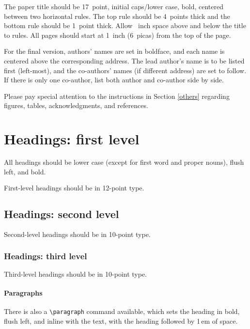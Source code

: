 \documentclass{article}
\begin{document}
The paper title should be 17~point, initial caps/lower case, bold, centered
between two horizontal rules. The top rule should be 4~points thick and the
bottom rule should be 1~point thick. Allow ~inch space above and
below the title to rules. All pages should start at 1~inch (6~picas) from the
top of the page.

For the final version, authors' names are set in boldface, and each name is
centered above the corresponding address. The lead author's name is to be listed
first (left-most), and the co-authors' names (if different address) are set to
follow. If there is only one co-author, list both author and co-author side by
side.

Please pay special attention to the instructions in Section \ref{others}
regarding figures, tables, acknowledgments, and references.

\section{Headings: first level}
\label{headings}

All headings should be lower case (except for first word and proper nouns),
flush left, and bold.

First-level headings should be in 12-point type.

\subsection{Headings: second level}

Second-level headings should be in 10-point type.

\subsubsection{Headings: third level}

Third-level headings should be in 10-point type.

\paragraph{Paragraphs}

There is also a \verb+\paragraph+ command available, which sets the heading in
bold, flush left, and inline with the text, with the heading followed by 1\,em
of space.
\end{document}

